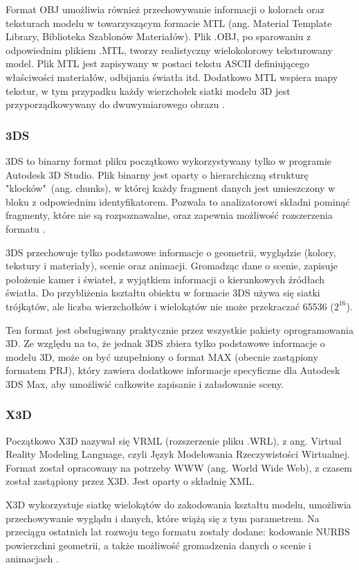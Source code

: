 Format OBJ umożliwia również przechowywanie informacji o kolorach oraz teksturach modelu w towarzyszącym formacie MTL (ang. Material Template Library, Biblioteka Szablonów Materiałów). Plik .OBJ, po sparowaniu z odpowiednim plikiem .MTL, tworzy realistyczny wielokolorowy teksturowany model. Plik MTL jest zapisywany w postaci tekstu ASCII definiującego właściwości materiałów, odbijania światła itd. Dodatkowo MTL wspiera mapy tekstur, w tym przypadku każdy wierzchołek siatki modelu 3D jest przyporządkowywany do dwuwymiarowego obrazu \cite{mtlInfo}.

\subsubsection{3DS}
3DS to binarny format pliku początkowo wykorzystywany tylko w programie Autodesk 3D Studio. Plik binarny jest oparty o hierarchiczną strukturę "klocków"\ (ang. chunks), w której każdy fragment danych jest umieszczony w bloku z odpowiednim identyfikatorem. Pozwala to analizatorowi składni pominąć fragmenty, które nie są rozpoznawalne, oraz zapewnia możliwość rozszerzenia formatu \cite{3dsformat}.

3DS przechowuje tylko podstawowe informacje o geometrii, wyglądzie (kolory, tekstury i materiały), scenie oraz animacji. Gromadząc dane o scenie, zapisuje położenie kamer i świateł, z wyjątkiem informacji o kierunkowych źródłach światła. Do przybliżenia kształtu obiektu w formacie 3DS używa się siatki trójkątów, ale liczba wierzchołków i wielokątów nie może przekraczać 65536 ($2^{16}$).

Ten format jest obsługiwany praktycznie przez wszystkie pakiety oprogramowania 3D. Ze względu na to, że jednak 3DS zbiera tylko podstawowe informacje o modelu 3D, może on być uzupełniony o format MAX (obecnie zastąpiony formatem PRJ), który zawiera dodatkowe informacje specyficzne dla Autodesk 3DS Max, aby umożliwić całkowite zapisanie i załadowanie sceny.

\subsubsection{X3D}
Początkowo X3D nazywał się VRML (rozszerzenie pliku .WRL), z ang. Virtual Reality Modeling Language, czyli Język Modelowania Rzeczywistości Wirtualnej. Format został opracowany na potrzeby WWW (ang. World Wide Web), z czasem został zastąpiony przez X3D. Jest oparty o składnię XML.

X3D wykorzystuje siatkę wielokątów do zakodowania kształtu modelu, umożliwia przechowywanie wyglądu i danych, które wiążą się z tym parametrem. Na przeciągu ostatnich lat rozwoju tego formatu zostały dodane: kodowanie NURBS powierzchni geometrii, a także możliwość gromadzenia danych o scenie i animacjach \cite{formatsinfo}.

